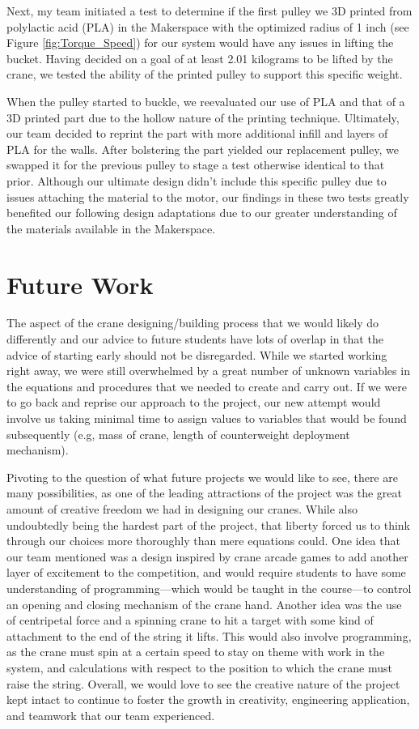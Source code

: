 \documentclass[letterpaper, 12pt]{article}
\begin{document}
Next, my team initiated a test to determine if the first pulley we 3D printed from polylactic acid (PLA) in the Makerspace with the optimized radius of 1 inch (see Figure \ref{fig:Torque_Speed}) for our system would have any issues in lifting the bucket. 
Having decided on a goal of at least 2.01 kilograms to be lifted by the crane, we tested the ability of the printed pulley to support this specific weight. 

When the pulley started to buckle, we reevaluated our use of PLA and that of a 3D printed part due to the hollow nature of the printing technique. 
Ultimately, our team decided to reprint the part with more additional infill and layers of PLA for the walls. 
After bolstering the part yielded our replacement pulley, we swapped it for the previous pulley to stage a test otherwise identical to that prior. 
Although our ultimate design didn’t include this specific pulley due to issues attaching the material to the motor, our findings in these two tests greatly benefited our following design adaptations due to our greater understanding of the materials available in the Makerspace.


\section{Future Work}
The aspect of the crane designing/building process that we would likely do differently and our advice to future students have lots of overlap in that the advice of starting early should not be disregarded. 
While we started working right away, we were still overwhelmed by a great number of unknown variables in the equations and procedures that we needed to create and carry out. 
If we were to go back and reprise our approach to the project, our new attempt would involve us taking minimal time to assign values to variables that would be found subsequently (e.g, mass of crane, length of counterweight deployment mechanism).

Pivoting to the question of what future projects we would like to see, there are many possibilities, as one of the leading attractions of the project was the great amount of creative freedom we had in designing our cranes. 
While also undoubtedly being the hardest part of the project, that liberty forced us to think through our choices more thoroughly than mere equations could. 
One idea that our team mentioned was a design inspired by crane arcade games to add another layer of excitement to the competition, and would require students to have some understanding of programming—which would be taught in the course—to control an opening and closing mechanism of the crane hand. 
Another idea was the use of centripetal force and a spinning crane to hit a target with some kind of attachment to the end of the string it lifts. 
This would also involve programming, as the crane must spin at a certain speed to stay on theme with work in the system, and calculations with respect to the position to which the crane must raise the string. 
Overall, we would love to see the creative nature of the project kept intact to continue to foster the growth in creativity, engineering application, and teamwork that our team experienced.
\end{document}
